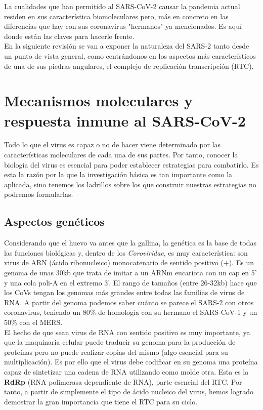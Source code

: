 \documentclass[a4paper,11pt]{report}
\begin{document}
 La cualidades que han permitido al SARS-CoV-2 causar la pandemia actual residen en sus característica biomoleculares pero, más en concreto en las diferencias que hay con sus coronavirus "hermanos"  ya mencionados. Es aquí donde están las claves para hacerle frente.\\
 
 En la siguiente revisión se van a exponer la naturaleza del SARS-2 tanto desde un punto de vista general, como centrándonos en los aspectos más característicos de una de sus piedras angulares, el complejo de replicación transcripción (RTC).
 \section{Mecanismos moleculares y respuesta inmune al SARS-CoV-2}
 Todo lo que el virus es capaz o no de hacer viene determinado por las características moleculares de cada una de sus partes. Por tanto, conocer la biología del virus es esencial para poder establecer estrategias para combatirlo. Es esta la razón por la que la investigación básica es tan importante como la aplicada, sino tenemos los ladrillos sobre los que construir nuestras estrategias no podremos formularlas.
 \subsection{Aspectos genéticos}
 Considerando que el huevo va antes que la gallina, la genética es la base de todas las funciones biológicas y, dentro de los \textit{Coroviridae}, es muy característica: son virus de ARN (ácido ribonucleico) monocatenario de sentido positivo (+). Es un genoma de unas 30kb que trata de imitar a un ARNm eucariota con un cap en 5' y una cola poli-A en el extremo 3'. El rango de tamaños (entre 26-32kb) hace que los CoVs tengan los genomas más grandes entre todas las familias de virus de RNA. 
 A partir del genoma podemos saber cuánto se parece el SARS-2 con otros coronavirus, teniendo un 80\% de homología con su hermano el SARS-CoV-1 y un 50\% con el MERS. \\
 
 El hecho de que sean virus de RNA con sentido positivo es muy importante, ya que la maquinaria celular puede traducir su genoma para la producción de proteínas pero no puede realizar copias del mismo (algo esencial para su multiplicación). Es por ello que el virus debe codificar en su genoma una proteína capaz de sintetizar una cadena de RNA utilizando como molde otra. Esta es la \textbf{RdRp} (RNA polimerasa dependiente de RNA), parte esencial del RTC. Por tanto, a partir de simplemente el tipo de ácido nucleico del virus, hemos logrado demostrar la gran importancia que tiene el RTC para su ciclo.\\
 
\end{document}
